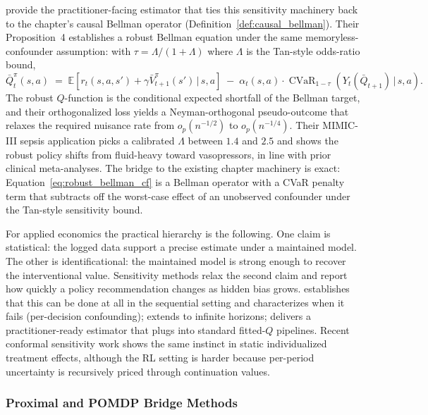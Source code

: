 \citet{brunsSmith2021modelFree} provide the practitioner-facing estimator that ties this sensitivity machinery back to the chapter's causal Bellman operator (Definition~\ref{def:causal_bellman}). Their Proposition~4 establishes a robust Bellman equation under the same memoryless-confounder assumption: with $\tau = \Lambda / (1 + \Lambda)$ where $\Lambda$ is the Tan-style odds-ratio bound,
\begin{equation}
\bar Q_t^\pi(s, a) \;=\; \mathbb{E}\!\left[r_t(s, a, s') + \gamma \bar V_{t+1}^\pi(s') \,\big|\, s, a\right]
\;-\; \alpha_t(s,a) \cdot \operatorname{CVaR}_{1-\tau}\!\left(Y_t(\bar Q_{t+1}) \,\big|\, s, a\right).
\label{eq:robust_bellman_cf}
\end{equation}
The robust $Q$-function is the conditional expected shortfall of the Bellman target, and their orthogonalized loss yields a Neyman-orthogonal pseudo-outcome that relaxes the required nuisance rate from $o_p(n^{-1/2})$ to $o_p(n^{-1/4})$. Their MIMIC-III sepsis application picks a calibrated $\Lambda$ between $1.4$ and $2.5$ and shows the robust policy shifts from fluid-heavy toward vasopressors, in line with prior clinical meta-analyses. The bridge to the existing chapter machinery is exact: Equation~\eqref{eq:robust_bellman_cf} is a Bellman operator with a CVaR penalty term that subtracts off the worst-case effect of an unobserved confounder under the Tan-style sensitivity bound.

For applied economics the practical hierarchy is the following. One claim is statistical: the logged data support a precise estimate under a maintained model. The other is identificational: the maintained model is strong enough to recover the interventional value. Sensitivity methods relax the second claim and report how quickly a policy recommendation changes as hidden bias grows. \citet{namkoong2020off} establishes that this can be done at all in the sequential setting and characterizes when it fails (per-decision confounding); \citet{kallus2020confounding} extends to infinite horizons; \citet{brunsSmith2021modelFree} delivers a practitioner-ready estimator that plugs into standard fitted-$Q$ pipelines. Recent conformal sensitivity work \citep{yinShiWangBlei2024conformalSensitivity} shows the same instinct in static individualized treatment effects, although the RL setting is harder because per-period uncertainty is recursively priced through continuation values.

\subsubsection{Proximal and POMDP Bridge Methods}
\label{subsubsec:proximal}

